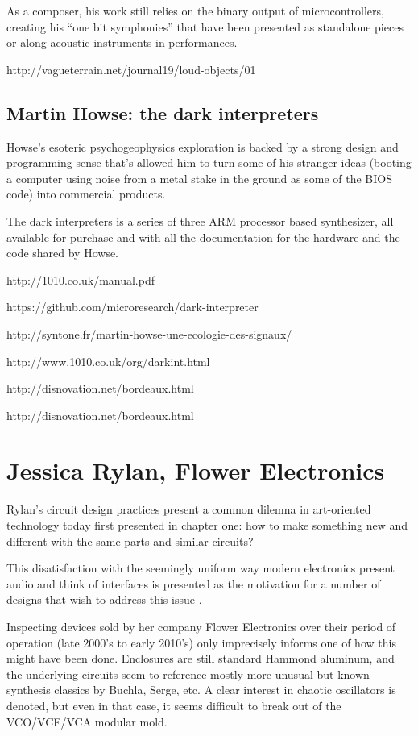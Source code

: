 As a composer, his work still relies on the binary output of microcontrollers, creating his ``one bit symphonies'' that have been presented as standalone pieces or along acoustic instruments in performances. 

http://vagueterrain.net/journal19/loud-objects/01

\subsection{Martin Howse: the dark interpreters}

Howse's esoteric psychogeophysics exploration is backed by a strong design and programming sense that's allowed him to turn some of his stranger ideas (booting a computer using noise from a metal stake in the ground as some of the BIOS code) into commercial products. 

The dark interpreters is a series of three ARM processor based synthesizer, all available for purchase and with all the documentation for the hardware and the code shared by Howse.  


http://1010.co.uk/manual.pdf

https://github.com/microresearch/dark-interpreter

http://syntone.fr/martin-howse-une-ecologie-des-signaux/

http://www.1010.co.uk/org/darkint.html

http://disnovation.net/bordeaux.html

http://disnovation.net/bordeaux.html

\section{Jessica Rylan, Flower Electronics}

Rylan's circuit design practices present a common dilemna in art-oriented technology today first presented in chapter one: how to make something new and different with the same parts and similar circuits? 

This disatisfaction with the seemingly uniform way modern electronics present audio and think of interfaces is presented as the motivation for a number of designs that wish to address this issue \citep[pp.139-155]{rodgers2010}. 

Inspecting devices sold by her company Flower Electronics over their period of operation (late 2000's to early 2010's) only imprecisely informs one of how this might have been done. Enclosures are still standard Hammond aluminum, and the underlying circuits seem to reference mostly more unusual but known synthesis classics by Buchla, Serge, etc. A clear interest in chaotic oscillators is denoted, but even in that case, it seems difficult to break out of the VCO/VCF/VCA modular mold. 

